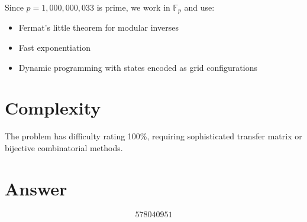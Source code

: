 \documentclass[12pt]{article}
\begin{document}
Since $p = 1{,}000{,}000{,}033$ is prime, we work in $\mathbb{F}_p$ and use:
\begin{itemize}
\item Fermat's little theorem for modular inverses
\item Fast exponentiation
\item Dynamic programming with states encoded as grid configurations
\end{itemize}

\section{Complexity}

The problem has difficulty rating 100\%, requiring sophisticated transfer matrix or bijective combinatorial methods.

\section{Answer}

\[
\boxed{578040951}
\]
\end{document}
